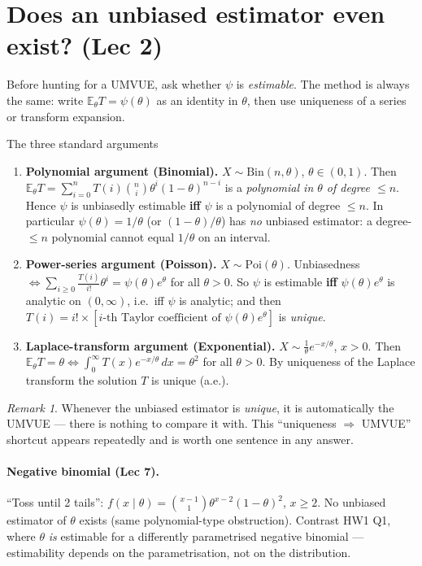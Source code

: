 \documentclass[11pt]{article}
\theoremstyle{remark}
\newtheorem*{remark}{Remark}
\newcommand{\E}{\mathbb{E}}
\begin{document}
\section{Does an unbiased estimator even exist? (Lec 2)}

Before hunting for a UMVUE, ask whether $\psi$ is \emph{estimable}. The method is always
the same: write $\E_\theta T=\psi(\theta)$ as an identity in $\theta$, then use uniqueness of
a series or transform expansion.

\begin{keybox}{The three standard arguments}
\begin{enumerate}[label=(\alph*)]
\item \textbf{Polynomial argument (Binomial).} $X\sim \mathrm{Bin}(n,\theta)$,
$\theta\in(0,1)$. Then $\E_\theta T=\sum_{i=0}^n T(i)\binom{n}{i}\theta^i(1-\theta)^{n-i}$ is a
\emph{polynomial in $\theta$ of degree $\le n$}. Hence $\psi$ is unbiasedly estimable
\textbf{iff} $\psi$ is a polynomial of degree $\le n$. In particular $\psi(\theta)=1/\theta$
(or $(1-\theta)/\theta$) has \emph{no} unbiased estimator: a degree-$\le n$ polynomial
cannot equal $1/\theta$ on an interval.
\item \textbf{Power-series argument (Poisson).} $X\sim\mathrm{Poi}(\theta)$. Unbiasedness
$\iff \sum_{i\ge0}\frac{T(i)}{i!}\theta^i=\psi(\theta)e^{\theta}$ for all $\theta>0$. So
$\psi$ is estimable \textbf{iff} $\psi(\theta)e^\theta$ is analytic on $(0,\infty)$, i.e.\ iff
$\psi$ is analytic; and then $T(i)=i!\times[\text{$i$-th Taylor coefficient of }\psi(\theta)e^{\theta}]$
is \emph{unique}.
\item \textbf{Laplace-transform argument (Exponential).} $X\sim\frac1\theta e^{-x/\theta}$,
$x>0$. Then $\E_\theta T=\theta\iff\int_0^\infty T(x)e^{-x/\theta}\,dx=\theta^2$ for all
$\theta>0$. By uniqueness of the Laplace transform the solution $T$ is unique (a.e.).
\end{enumerate}
\end{keybox}

\begin{remark}
Whenever the unbiased estimator is \emph{unique}, it is automatically the UMVUE --- there is
nothing to compare it with. This ``uniqueness $\Rightarrow$ UMVUE'' shortcut appears
repeatedly and is worth one sentence in any answer.
\end{remark}

\paragraph{Negative binomial (Lec 7).} ``Toss until 2 tails'':
$f(x\mid\theta)=\binom{x-1}{1}\theta^{x-2}(1-\theta)^2$, $x\ge2$. No unbiased estimator of
$\theta$ exists (same polynomial-type obstruction). Contrast HW1 Q1, where $\theta$ \emph{is}
estimable for a differently parametrised negative binomial --- estimability depends on the
parametrisation, not on the distribution.
\end{document}
